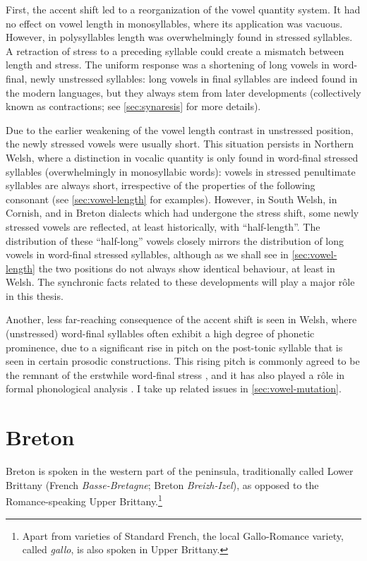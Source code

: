 First, the accent shift led to a reorganization of the vowel quantity system. It had no effect on vowel length in monosyllables, where its application was vacuous. However, in polysyllables length was overwhelmingly found in stressed syllables. A retraction of stress to a preceding syllable could create a mismatch between length and stress. The uniform response was a shortening of long vowels in word\hyp final, newly unstressed syllables: long vowels in final syllables are indeed found in the modern languages, but they always stem from later developments (collectively known as contractions; see \cref{sec:synaresis} for more details).

Due to the earlier weakening of the vowel length contrast in unstressed position, the newly stressed vowels were usually short. This situation persists in Northern Welsh, where a distinction in vocalic quantity is only found in word\hyp final stressed syllables (\ie overwhelmingly in monosyllabic words): vowels in stressed penultimate syllables are always short, irrespective of the properties of the following consonant (see \cref{sec:vowel-length} for examples). However, in South Welsh, in Cornish, and in Breton dialects which had undergone the stress shift, some newly stressed vowels are reflected, at least historically, with \enquote{half\hyp length}. The distribution of these \enquote{half\hyp long} vowels closely mirrors the distribution of long vowels in word\hyp final stressed syllables, although  as we shall see in \cref{sec:vowel-length} the two positions do not always show identical behaviour, at least in Welsh. The synchronic facts related to these developments will play a major rôle in this thesis.

Another, less far\hyp reaching consequence of the accent shift is seen in Welsh, where (unstressed) word\hyp final syllables often exhibit a high degree of phonetic prominence, due to a significant rise in pitch on the post\hyp tonic syllable that is seen in certain prosodic constructions. This rising pitch is commonly agreed to be the remnant of the erstwhile word\hyp final stress \citep{watkins76:_cyfnew_gymraeg}, and it has also played a rôle in formal phonological analysis \citep{bosch96:_promin}. I take up related issues in \cref{sec:vowel-mutation}.

\section{Breton}
\label{sec:breton}

Breton is spoken in the western part of the peninsula, traditionally called Lower Brittany (French \emph{Basse-Bretagne}; Breton \emph{Breizh-Izel}), as opposed to the Romance-speaking Upper Brittany.\footnote{Apart from varieties of Standard French, the local Gallo-Romance variety, called \emph{gallo}, is also spoken in Upper Brittany.}

